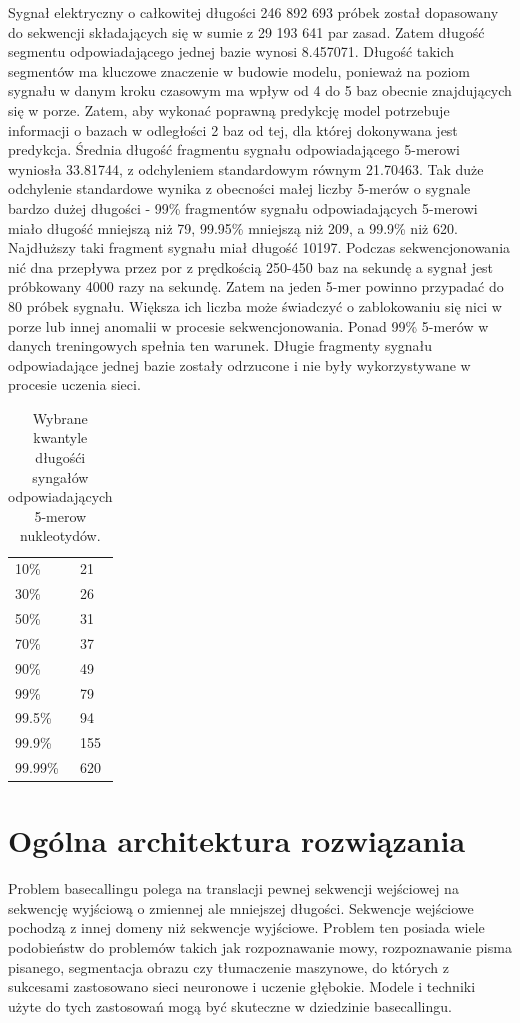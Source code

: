 \documentclass[a4paper,11pt,twoside]{report}
\theoremstyle{definition}
\begin{document}
Sygnał elektryczny o całkowitej długości 246 892 693 próbek został dopasowany do sekwencji składających się w sumie z 29 193 641 par zasad. Zatem długość segmentu odpowiadającego jednej bazie wynosi 8.457071. Długość takich segmentów ma kluczowe znaczenie w budowie modelu, ponieważ na poziom sygnału w danym kroku czasowym ma wpływ od 4 do 5 baz obecnie znajdujących się w porze. Zatem, aby wykonać poprawną predykcję model potrzebuje informacji o bazach w odległości 2 baz od tej, dla której dokonywana jest predykcja. Średnia długość fragmentu sygnału odpowiadającego 5-merowi wyniosła 33.81744, z odchyleniem standardowym równym 21.70463. Tak duże odchylenie standardowe wynika z obecności małej liczby 5-merów o sygnale bardzo dużej długości - 99\% fragmentów sygnału odpowiadających 5-merowi miało długość mniejszą niż 79, 99.95\% mniejszą niż 209, a 99.9\% niż 620. Najdłuższy taki fragment sygnału miał długość 10197. Podczas sekwencjonowania nić dna przepływa przez por z prędkością 250-450 baz na sekundę a sygnał jest próbkowany 4000 razy na sekundę. Zatem na jeden 5-mer powinno przypadać do 80 próbek sygnału. Większa ich liczba może świadczyć o zablokowaniu się nici w porze lub innej anomalii w procesie sekwencjonowania. Ponad 99\% 5-merów w danych treningowych spełnia ten warunek. Długie fragmenty sygnału odpowiadające jednej bazie zostały odrzucone i nie były wykorzystywane w procesie uczenia sieci.

\begin{table}[]
	\centering
	\begin{tabular}{ll}
		10\%    & 21  \\
		30\%    & 26  \\
		50\%    & 31  \\
		70\%    & 37  \\
		90\%    & 49  \\
		99\%    & 79  \\
		99.5\%  & 94  \\
		99.9\%  & 155 \\
		99.99\% & 620
	\end{tabular}
	\caption{\label{}Wybrane kwantyle długośći syngałów odpowiadających 5-merow nukleotydów.}
\end{table}

\section{Ogólna architektura rozwiązania}

Problem basecallingu polega na translacji pewnej sekwencji wejściowej na sekwencję wyjściową o zmiennej ale mniejszej długości. Sekwencje wejściowe pochodzą z innej domeny niż sekwencje wyjściowe. Problem ten posiada wiele podobieństw do problemów takich jak rozpoznawanie mowy, rozpoznawanie pisma pisanego, segmentacja obrazu czy tłumaczenie maszynowe, do których z sukcesami zastosowano sieci neuronowe i uczenie głębokie. Modele i techniki użyte do tych zastosowań mogą być skuteczne w dziedzinie basecallingu.
\end{document}
